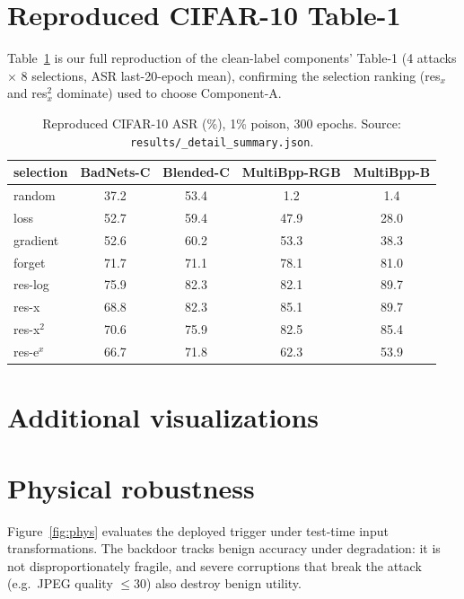 \documentclass[10pt,twocolumn,letterpaper]{article}
\begin{document}
\section{Reproduced CIFAR-10 Table-1}
\label{sec:baseline-table1}
Table~\ref{tab:baseline-table1} is our full reproduction of the clean-label
components' Table-1 (4 attacks $\times$ 8 selections, ASR last-20-epoch mean),
confirming the selection ranking (res$_x$ and res$_x^2$ dominate) used to choose
Component-A.

\begin{table}[h]
\centering
\small
\setlength{\tabcolsep}{3.2pt}
\begin{tabular}{l c c c c}
\toprule
selection & BadNets-C & Blended-C & MultiBpp-RGB & MultiBpp-B \\
\midrule
random    & 37.2 & 53.4 & 1.2  & 1.4  \\
loss      & 52.7 & 59.4 & 47.9 & 28.0 \\
gradient  & 52.6 & 60.2 & 53.3 & 38.3 \\
forget    & 71.7 & 71.1 & 78.1 & 81.0 \\
res-log   & 75.9 & 82.3 & 82.1 & 89.7 \\
res-x     & 68.8 & 82.3 & 85.1 & 89.7 \\
res-x$^2$ & 70.6 & 75.9 & 82.5 & 85.4 \\
res-e$^x$ & 66.7 & 71.8 & 62.3 & 53.9 \\
\bottomrule
\end{tabular}
\caption{Reproduced CIFAR-10 ASR (\%), 1\% poison, 300 epochs. Source:
\texttt{results/\_detail\_summary.json}.}
\label{tab:baseline-table1}
\end{table}



\section{Additional visualizations}




\section{Physical robustness}
\label{sec:phys}
Figure~\ref{fig:phys} evaluates the deployed trigger under test-time input
transformations. The backdoor tracks benign accuracy under degradation: it is
not disproportionately fragile, and severe corruptions that break the attack
(e.g.\ JPEG quality $\le\!30$) also destroy benign utility.


{\small


}
\end{document}
